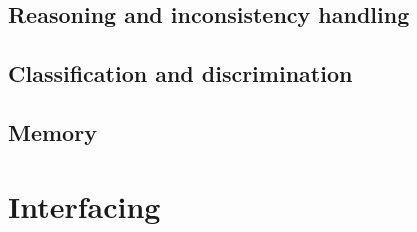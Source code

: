 \subsection{Reasoning and inconsistency handling}
\label{sect|reasoning}


\subsection{Classification and discrimination}
\label{subssect|discrimination}

\subsection{Memory}
\label{subssect|memory}

\section{Interfacing}
\label{sect|interfacing}
